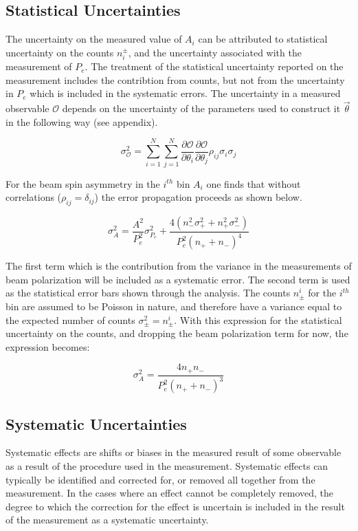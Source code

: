 \subsection*{Statistical Uncertainties}
The uncertainty on the measured value of $A_i$ can be attributed to statistical uncertainty on the counts $n_{i}^{\pm}$, and the uncertainty associated with the measurement of $P_e$.  The treatment of the statistical uncertainty reported on the measurement includes the contribtion from counts, but not from the uncertainty in $P_e$ which is included in the systematic errors.  The uncertainty in a measured observable $\mathcal{O}$ depends on the uncertainty of the parameters used to construct it $\vec{\theta}$ in the following way (see appendix).

\begin{equation}
  \label{eqn:error-propagation}
  \sigma_{\mathcal{O}}^2 = \sum_{i=1}^{N} \sum_{j=1}^{N} \frac{\partial \mathcal{O}}{\partial \theta_i} \frac{\partial \mathcal{O}}{\partial \theta_j} \rho_{ij} \sigma_i \sigma_j 
\end{equation}
  
For the beam spin asymmetry in the $i^{th}$ bin $A_i$ one finds that without correlations ($\rho_{ij} = \delta_{ij}$) the error propagation proceeds as shown below.

\begin{equation}
  \sigma_{A}^{2} = \frac{A^2}{P_{e}^2} \sigma_{P_{e}}^{2} + \frac{4 (n_{-}^{2} \sigma_{+}^{2}  + n_{+}^{2} \sigma_{-}^{2})}{ P_{e}^{2} (n_{+} + n_{-})^4}
\end{equation} 

The first term which is the contribution from the variance in the measurements of beam polarization will be included as a systematic error.  The second term is used as the statistical error bars shown through the analysis.  The counts $n_{\pm}^{i}$ for the $i^{th}$ bin are assumed to be Poisson in nature, and therefore have a variance equal to the expected number of counts $\sigma_{\pm}^{2} = n_{\pm}^{i}$.  With this expression for the statistical uncertainty on the counts, and dropping the beam polarization term for now, the expression becomes: 

\begin{equation}
  \sigma_{A}^{2} = \frac{4n_+ n_-}{P_{e}^{2} (n_+ + n_-)^3}
\end{equation}

\subsection*{Systematic Uncertainties}
Systematic effects are shifts or biases in the measured result of some observable as a result of the procedure used in the measurement.  Systematic effects can typically be identified and corrected for, or removed all together from the measurement.  In the cases where an effect cannot be completely removed, the degree to which the correction for the effect is uncertain is included in the result of the measurement as a systematic uncertainty. \\

